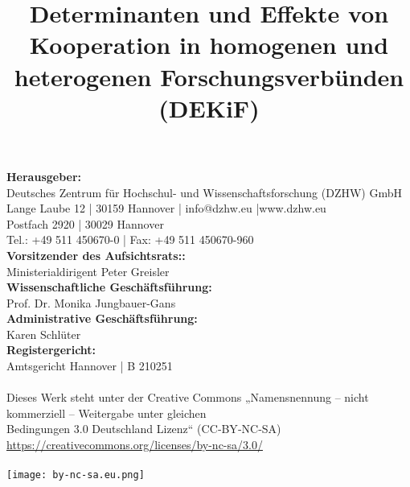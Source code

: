 \documentclass[a4paper,10pt,twoside]{article}
\begin{document}
\title{Determinanten und Effekte von Kooperation in homogenen und heterogenen Forschungsverbünden (DEKiF)}
\date{} %
\maketitle\thispagestyle{empty}
\restoregeometry
\cleardoublepage
{}


\null\vfill
\footnotesize
\noindent\textbf{Herausgeber:}\\
Deutsches Zentrum für Hochschul- und Wissenschaftsforschung (DZHW) GmbH\\
Lange Laube 12 | 30159 Hannover | info@dzhw.eu |www.dzhw.eu\\
Postfach 2920 | 30029 Hannover\\
Tel.: +49 511 450670-0 | Fax: +49 511 450670-960\\
\textbf{Vorsitzender des Aufsichtsrats::}\\
Ministerialdirigent Peter Greisler\\
\textbf{Wissenschaftliche Geschäftsführung:}\\
Prof. Dr. Monika Jungbauer-Gans\\
\textbf{Administrative Geschäftsführung:}\\
Karen Schlüter\\
\textbf{Registergericht:}\\
Amtsgericht Hannover | B 210251\\
\\
Dieses Werk steht unter der Creative Commons „Namensnennung – nicht\\ kommerziell – Weitergabe unter gleichen\\
Bedingungen 3.0 Deutschland Lizenz“ (CC‐BY‐NC‐SA)\\
\href{http://www.namsu.de}{https://creativecommons.org/licenses/by-nc-sa/3.0/}\\
\\
\texttt{[image: by-nc-sa.eu.png]}


\cleardoublepage
\setcounter{page}{1}
\tableofcontents

\cleardoublepage
{}
\listoffigures
{}

\cleardoublepage
\listoftables
{}

\cleardoublepage
{}
\end{document}

